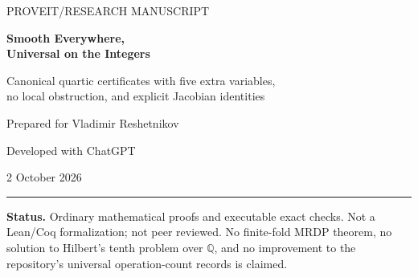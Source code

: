 \documentclass[11pt,a4paper]{article}
\theoremstyle{definition}
\theoremstyle{remark}
\newcommand{\Z}{\mathbb Z}
\newcommand{\Q}{\mathbb Q}
\begin{document}
\hypersetup{pageanchor=false}
\begin{titlepage}
\thispagestyle{empty}
\vspace*{2mm}%
{\Large\color{MidnightBlue} PROVEIT\quad /\quad RESEARCH MANUSCRIPT\par}
\vspace{12mm}
{\Huge\bfseries Smooth Everywhere,\\[4pt]
Universal on the Integers\par}
\vspace{7mm}
{\Large Canonical quartic certificates with five extra variables,\\
no local obstruction, and explicit Jacobian identities\par}
\vspace{12mm}
{\large Prepared for Vladimir Reshetnikov\par}
{\normalsize Developed with ChatGPT\par}
{\normalsize 2 October 2026\par}
\vspace{10mm}
\noindent\rule{\textwidth}{0.5pt}
\begin{abstract}
We give a uniform arithmetic-geometric finalizer for Diophantine computation.
Given any finite system of quadratic integer equations in $n$ variables, it
constructs one polynomial of exact degree four in $n+5$ variables. Its natural
zeros are in explicit bijection with the original natural zeros, and its integer
zeros are exactly two sign-related copies of the original integer zeros.
Nevertheless, its affine scheme is smooth over $\Z$, every geometric fibre is
integral, a nonnegative dyadic rational point can always be constructed, and
there are integral $p$-adic points for every prime. Rational points are dense in
the real locus, which has exactly two path components. A degree-bounded
integral B\'ezout identity certifies smoothness without a genericity search.

The construction yields a sharply specified undecidable class of smooth,
everywhere locally soluble quartic equations. It also preserves canonical
bounded-execution certificates without increasing witness multiplicity. We
supply a counter-machine frontend, a complete worked export, a sharp
weighted-guard obstruction in this architecture, and
21,128 successful symbolic and finite checks. General undecidability for
smooth varieties is known; the contribution proposed here is the explicit
normal form and its combined guarantees, not a claim of priority for that
general phenomenon.
\end{abstract}
\vfill
\noindent\textbf{Status.} Ordinary mathematical proofs and executable exact checks.
Not a Lean/Coq formalization; not peer reviewed. No finite-fold MRDP theorem,
no solution to Hilbert's tenth problem over $\Q$, and no improvement to the
repository's universal operation-count records is claimed.


\end{titlepage}
\end{document}
